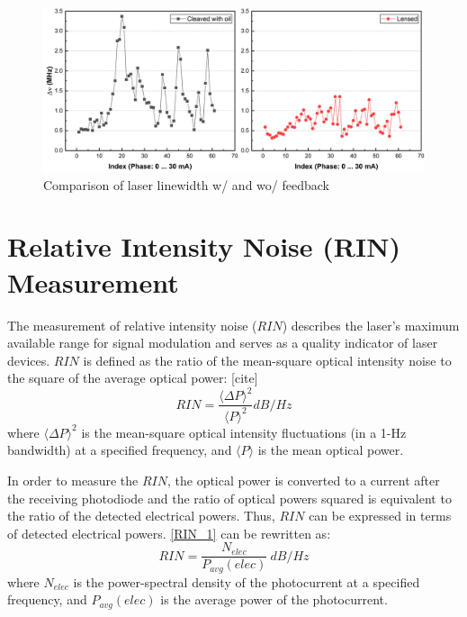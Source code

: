 \begin{figure}[ht]
    \centering
    \includegraphics[width=\linewidth]{figures/LB_Cleaved_and_Lensed.png}
    \caption{Comparison of laser linewidth w/ and wo/ feedback}
    \label{fig:LB_Cleaved_and_Lensed}
\end{figure}

\section{Relative Intensity Noise (RIN) Measurement}\label{sec:RIN_measurement}
The measurement of relative intensity noise ($RIN$) describes the laser’s maximum available range for signal modulation and serves as a quality indicator of laser devices. $RIN$ is defined as the ratio of the mean-square optical intensity noise to the square of the average optical power: [cite]
\begin{equation}
    RIN=\frac{\langle \Delta P \rangle ^2}{\langle P \rangle ^2}dB/Hz
\label{RIN_1}
\end{equation}
where $\langle \Delta P \rangle ^2$ is the mean-square optical intensity fluctuations (in a 1-Hz bandwidth) at a specified frequency, and $\langle P \rangle$ is the mean optical power.

In order to measure the $RIN$, the optical power is converted to a current after the receiving photodiode and the ratio of optical powers squared is equivalent to the ratio of the detected electrical powers. Thus, $RIN$ can be expressed in terms of detected electrical powers. \autoref{RIN_1} can be rewritten as:
\begin{equation}
    RIN=\frac{N_{elec}}{P_{avg}(elec)} \ dB/Hz
    \label{RIN_2}
\end{equation}
where $N_{elec}$ is the power-spectral density of the photocurrent at a specified frequency, and $P_{avg}(elec)$ is the average power of the photocurrent.

